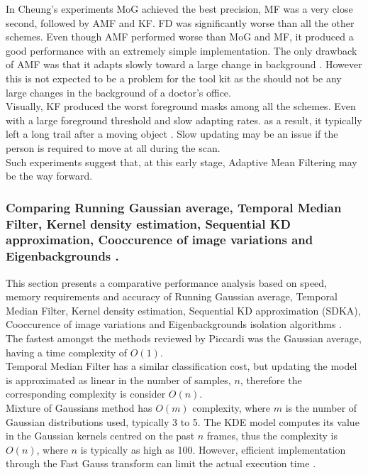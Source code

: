 In Cheung's experiments \cite{Cheung2007} MoG achieved the best precision, MF was a very close second, followed by AMF and KF. FD was significantly worse than all the other schemes. Even though AMF performed worse than MoG and MF, it produced a good performance with an extremely simple implementation. The only drawback of AMF was that it adapts slowly toward a large change in background \cite{Cheung2007}. However this is not expected to be a problem for the tool kit as the should not be any large changes in the background of a doctor's office.\\

Visually, KF produced the worst foreground masks among all the schemes. Even with a large foreground threshold and slow adapting rates. as a result, it typically left a long trail after a moving object \cite{Cheung2007}. Slow updating may be an issue if the  person is required to move at all during the scan.\\

Such experiments suggest that, at this early stage, Adaptive Mean Filtering may be the way forward.\\

\subsubsection{Comparing Running Gaussian average, Temporal Median Filter, Kernel density estimation, Sequential KD approximation, Cooccurence of image variations and Eigenbackgrounds \cite{Piccardi2004}.}

This section presents a comparative performance analysis based on
speed, memory requirements and accuracy of Running Gaussian average, Temporal Median Filter, Kernel density estimation, Sequential KD approximation (SDKA), Cooccurence of image variations and Eigenbackgrounds isolation algorithms \cite{Piccardi2004}.\\

The fastest amongst the methods reviewed by Piccardi \cite{Piccardi2004} was the Gaussian average, having a time complexity of $O(1)$.\\

Temporal Median Filter has a similar classification cost, but updating the  model is approximated as linear in the number of samples, $n$, therefore the corresponding complexity is consider $O(n)$. \\

Mixture of Gaussians method has $O(m)$ complexity, where $m$ is the number of Gaussian distributions used, typically 3 to 5. 
The KDE model computes its value in the Gaussian kernels centred on the past 
$n$ frames, thus the complexity is $O(n)$, where $n$ is typically as high as 100. 
However, efficient implementation through the Fast Gauss transform can
limit the actual execution time \cite{Elgammal2003}.\\

